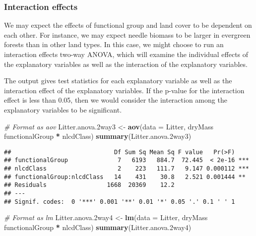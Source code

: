 \documentclass[
]{article}
\newenvironment{Shaded}{\begin{snugshade}}{\end{snugshade}}
\newcommand{\CommentTok}[1]{\textcolor[rgb]{0.56,0.35,0.01}{\textit{#1}}}
\newcommand{\DataTypeTok}[1]{\textcolor[rgb]{0.13,0.29,0.53}{#1}}
\newcommand{\FloatTok}[1]{\textcolor[rgb]{0.00,0.00,0.81}{#1}}
\newcommand{\KeywordTok}[1]{\textcolor[rgb]{0.13,0.29,0.53}{\textbf{#1}}}
\newcommand{\NormalTok}[1]{#1}
\newcommand{\OperatorTok}[1]{\textcolor[rgb]{0.81,0.36,0.00}{\textbf{#1}}}
\newcommand{\StringTok}[1]{\textcolor[rgb]{0.31,0.60,0.02}{#1}}
\begin{document}
\hypertarget{interaction-effects}{%
\subsubsection{Interaction effects}\label{interaction-effects}}

We may expect the effects of functional group and land cover to be
dependent on each other. For instance, we may expect needle biomass to
be larger in evergreen forests than in other land types. In this case,
we might choose to run an interaction effects two-way ANOVA, which will
examine the individual effects of the explanatory variables as well as
the interaction of the explanatory variables.

The output gives test statistics for each explanatory variable as well
as the interaction effect of the explanatory variables. If the p-value
for the interaction effect is less than 0.05, then we would consider the
interaction among the explanatory variables to be significant.

\begin{Shaded}
\begin{Highlighting}[]
\CommentTok{# Format as aov}
\NormalTok{Litter.anova}\FloatTok{.2}\NormalTok{way3 <-}\StringTok{ }\KeywordTok{aov}\NormalTok{(}\DataTypeTok{data =}\NormalTok{ Litter, dryMass }\OperatorTok{~}\StringTok{ }\NormalTok{functionalGroup }\OperatorTok{*}\StringTok{ }\NormalTok{nlcdClass)}
\KeywordTok{summary}\NormalTok{(Litter.anova}\FloatTok{.2}\NormalTok{way3)}
\end{Highlighting}
\end{Shaded}

\begin{verbatim}
##                             Df Sum Sq Mean Sq F value   Pr(>F)    
## functionalGroup              7   6193   884.7  72.445  < 2e-16 ***
## nlcdClass                    2    223   111.7   9.147 0.000112 ***
## functionalGroup:nlcdClass   14    431    30.8   2.521 0.001444 ** 
## Residuals                 1668  20369    12.2                     
## ---
## Signif. codes:  0 '***' 0.001 '**' 0.01 '*' 0.05 '.' 0.1 ' ' 1
\end{verbatim}

\begin{Shaded}
\begin{Highlighting}[]
\CommentTok{# Format as lm}
\NormalTok{Litter.anova}\FloatTok{.2}\NormalTok{way4 <-}\StringTok{ }\KeywordTok{lm}\NormalTok{(}\DataTypeTok{data =}\NormalTok{ Litter, dryMass }\OperatorTok{~}\StringTok{ }\NormalTok{functionalGroup }\OperatorTok{*}\StringTok{ }\NormalTok{nlcdClass)}
\KeywordTok{summary}\NormalTok{(Litter.anova}\FloatTok{.2}\NormalTok{way4)}
\end{Highlighting}
\end{Shaded}
\end{document}
